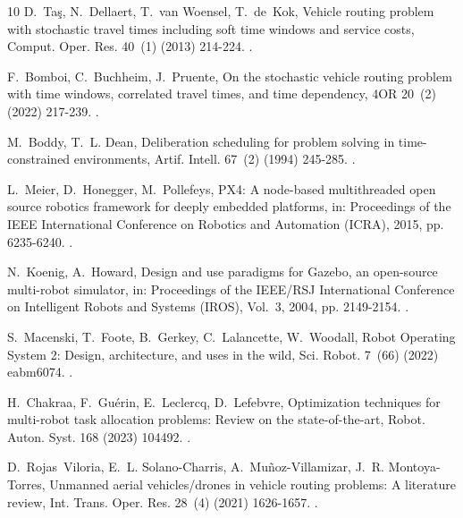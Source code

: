 \documentclass[a4paper,fleqn]{cas-dc}
\begin{document}
\begin{thebibliography}{10}
D.~Ta{\c{s}}, N.~Dellaert, T.~van Woensel, T.~de~Kok, Vehicle routing problem
  with stochastic travel times including soft time windows and service costs,
  Comput. Oper. Res. 40~(1) (2013) 214-224.
\newblock \href {https://doi.org/10.1016/j.cor.2012.06.008}
  {}.

F.~Bomboi, C.~Buchheim, J.~Pruente, On the stochastic vehicle routing problem
  with time windows, correlated travel times, and time dependency, 4OR 20~(2)
  (2022) 217-239.
\newblock \href {https://doi.org/10.1007/s10288-021-00476-z}
  {}.

M.~Boddy, T.~L. Dean, Deliberation scheduling for problem solving in
  time-constrained environments, Artif. Intell. 67~(2) (1994) 245-285.
\newblock \href {https://doi.org/10.1016/0004-3702(94)90054-X}
  {}.

L.~Meier, D.~Honegger, M.~Pollefeys, {PX4}: A node-based multithreaded open
  source robotics framework for deeply embedded platforms, in: Proceedings of
  the IEEE International Conference on Robotics and Automation (ICRA), 2015,
  pp. 6235-6240.
\newblock \href {https://doi.org/10.1109/ICRA.2015.7140074}
  {}.

N.~Koenig, A.~Howard, Design and use paradigms for {Gazebo}, an open-source
  multi-robot simulator, in: Proceedings of the IEEE/RSJ International
  Conference on Intelligent Robots and Systems (IROS), Vol.~3, 2004, pp.
  2149-2154.
\newblock \href {https://doi.org/10.1109/IROS.2004.1389727}
  {}.

S.~Macenski, T.~Foote, B.~Gerkey, C.~Lalancette, W.~Woodall, {Robot Operating
  System 2}: Design, architecture, and uses in the wild, Sci. Robot. 7~(66)
  (2022) eabm6074.
\newblock \href {https://doi.org/10.1126/scirobotics.abm6074}
  {}.

H.~Chakraa, F.~Gu{\'e}rin, E.~Leclercq, D.~Lefebvre, Optimization techniques
  for multi-robot task allocation problems: Review on the state-of-the-art,
  Robot. Auton. Syst. 168 (2023) 104492.
\newblock \href {https://doi.org/10.1016/j.robot.2023.104492}
  {}.

D.~Rojas~Viloria, E.~L. Solano-Charris, A.~Mu{\~n}oz-Villamizar, J.~R.
  Montoya-Torres, Unmanned aerial vehicles/drones in vehicle routing problems:
  A literature review, Int. Trans. Oper. Res. 28~(4) (2021) 1626-1657.
\newblock \href {https://doi.org/10.1111/itor.12783}
  {}.


\end{thebibliography}
\end{document}
